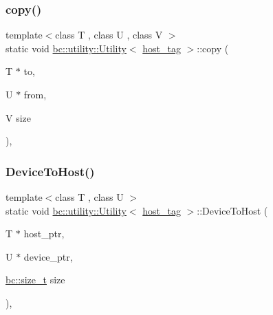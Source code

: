 \subsubsection{\texorpdfstring{copy()}{copy()}}
{\footnotesize\ttfamily template$<$class T , class U , class V $>$ \\
static void \hyperlink{structbc_1_1utility_1_1Utility}{bc\+::utility\+::\+Utility}$<$ \hyperlink{structbc_1_1host__tag}{host\+\_\+tag} $>$\+::copy (\begin{DoxyParamCaption}\item[{T $\ast$}]{to,  }\item[{U $\ast$}]{from,  }\item[{V}]{size }\end{DoxyParamCaption})\hspace{0.3cm}{\ttfamily [inline]}, {\ttfamily [static]}}

\mbox{\label{structbc_1_1utility_1_1Utility_3_01host__tag_01_4_a36373909f09a03f833d26c5bebcea1c5}} 
\subsubsection{\texorpdfstring{Device\+To\+Host()}{DeviceToHost()}}
{\footnotesize\ttfamily template$<$class T , class U $>$ \\
static void \hyperlink{structbc_1_1utility_1_1Utility}{bc\+::utility\+::\+Utility}$<$ \hyperlink{structbc_1_1host__tag}{host\+\_\+tag} $>$\+::Device\+To\+Host (\begin{DoxyParamCaption}\item[{T $\ast$}]{host\+\_\+ptr,  }\item[{U $\ast$}]{device\+\_\+ptr,  }\item[{\hyperlink{namespacebc_aaf8e3fbf99b04b1b57c4f80c6f55d3c5}{bc\+::size\+\_\+t}}]{size }\end{DoxyParamCaption})\hspace{0.3cm}{\ttfamily [inline]}, {\ttfamily [static]}}

\mbox{\label{structbc_1_1utility_1_1Utility_3_01host__tag_01_4_a341dbdab86fd6dc455604f7a4f44b23d}} 
